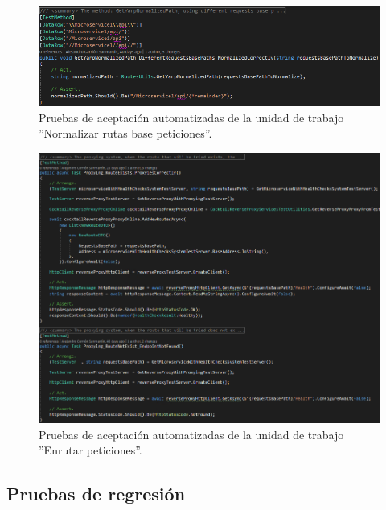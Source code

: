 \documentclass[11pt,spanish,listoffigures]{tfgetsinf}
\begin{document}
\begin{figure}[H] %
\centering
\includegraphics[width=1\textwidth]{imagenes/testGetYarpNormalizedRequestsBasePath}
\caption{Pruebas de aceptación automatizadas de la unidad de trabajo ''Normalizar rutas base peticiones''.}
	\label{testGetYarpNormalizedRequestsBasePath}
\end{figure}

\begin{figure}[H] %
\centering
\includegraphics[width=1\textwidth]{imagenes/testsEnrutarPeticiones}
\caption{Pruebas de aceptación automatizadas de la unidad de trabajo ''Enrutar peticiones''.}
	\label{testsEnrutamiento}
\end{figure}


		\subsection{Pruebas de regresión} \label{pruebasDeRegresion}
\end{document}
